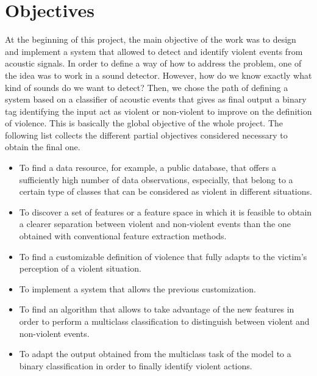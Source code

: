 	
\section{Objectives}
\label{section:objectives}

	At the beginning of this project, the main objective of the work was to design and implement a system that allowed to detect and identify violent events from acoustic signals. In order to define a way of how to address the problem, one of the idea was to work in a sound detector. However, how do we know exactly what kind of sounds do we want to detect? Then, we chose the path of defining a system based on a classifier of acoustic events that gives as final output a binary tag identifying the input act as violent or non-violent to improve on the definition of violence. This is basically the global objective of the whole project. The following list collects the different partial objectives considered necessary to obtain the final one.
	
	\begin{itemize}
		\item To find a data resource, for example, a public database, that offers a sufficiently high number of data observations, especially, that belong to a certain type of classes that can be considered as violent in different situations.
		\item To discover a set of features or a feature space in which it is feasible to obtain a clearer separation between violent and non-violent events than the one obtained with conventional feature extraction methods.
		\item To find a customizable definition of violence that fully adapts to the victim's perception of a violent situation. %
		\item To implement a system that allows the previous customization. %
		\item To find an algorithm that allows to take advantage of the new features in order to perform a multiclass classification to distinguish between violent and non-violent events.
		\item To adapt the output obtained from the multiclass task of the model to a binary classification in order to finally identify violent actions.
	\end{itemize}
		
